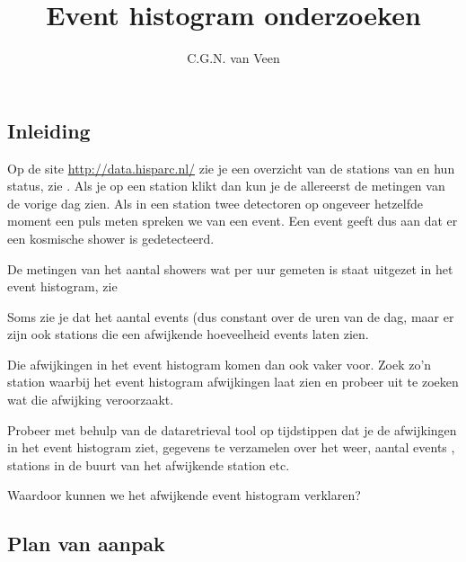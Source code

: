 


\title{Event histogram onderzoeken}
\author{C.G.N. van Veen}



\maketitle

\begin{questions}

\begin{EnvUplevel}
\section{Inleiding}

Op de site \url{http://data.hisparc.nl/} zie je een overzicht van de
stations van \hisparc en hun status, zie . Als
je op een station klikt dan kun je de allereerst de metingen van de
vorige dag zien. Als in een station twee detectoren op ongeveer
hetzelfde moment een puls meten spreken we van een event. Een event
geeft dus aan dat er een kosmische shower is gedetecteerd.

De metingen van het aantal showers wat per uur gemeten is staat uitgezet
in het event histogram, zie 

Soms zie je dat het aantal events (dus  constant over de uren van de dag,
maar er zijn ook stations die een afwijkende hoeveelheid events laten
zien.

Die afwijkingen in het event histogram komen dan ook vaker
voor. Zoek zo'n station waarbij het event histogram afwijkingen laat
zien en probeer uit te zoeken wat die afwijking veroorzaakt.

Probeer met behulp van de dataretrieval tool op tijdstippen dat
je de afwijkingen in het event histogram ziet, gegevens te verzamelen
over het weer, aantal events , stations in de buurt van het afwijkende
station etc.
\end{EnvUplevel}

\question Waardoor kunnen we het afwijkende event histogram verklaren?


\begin{EnvUplevel}
\section{Plan van aanpak}


\end{EnvUplevel}
\end{questions}
